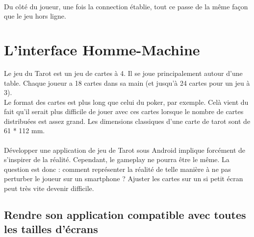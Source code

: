 \documentclass[a4paper]{report}
\begin{document}
		\\ 
		Du côté du joueur, une fois la connection établie, tout ce passe de la même façon que le jeu hors ligne.\\













\chapter{L’interface Homme-Machine}
	Le jeu du Tarot est un jeu de cartes à 4. Il se joue principalement autour d’une table. Chaque joueur a 18 cartes dans sa main (et jusqu’à 24 cartes pour un jeu à 3).\\
	Le format des cartes est plus long que celui du poker, par exemple. Celà vient du fait qu’il serait plus difficile de jouer avec ces cartes lorsque le nombre de cartes distribuées est assez 		grand. Les dimensions classiques d'une carte de tarot sont de 61 * 112 mm. \\
	\\  
	Développer une application de jeu de Tarot sous Android implique forcément de s’inspirer de la réalité. Cependant, le gameplay ne pourra être le même. La question est donc : comment représenter 		la réalité de telle manière à ne pas perturber le joueur sur un smartphone ? Ajuster les cartes sur un si petit écran peut très vite devenir difficile.\\

	\section{Rendre son application compatible avec toutes les tailles d’écrans}
	
\end{document}
